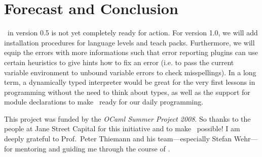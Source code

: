 
\section{Forecast and Conclusion}

\easyocaml\ in version 0.5 is not yet completely ready for action. For version 
1.0, we will add installation procedures for language levels and 
teach packs.
Furthermore, we will equip the errors with more informations such that error
reporting plugins can use certain heuristics to give hints how to fix an error
(i.e. to pass the current variable environment to unbound variable errors to
check misspellings).
In a long term, a dynamically typed interpreter would be great for the very
first lessons in programming without the need to think about types, as well as
the support for module declarations to make \easyocaml\ ready for our daily
programming.


This project was funded by the \emph{OCaml Summer Project 2008}.
So thanks to the people at Jane Street Capital for this initiative and to
make \easyocaml\ possible!
I am deeply grateful to Prof.\ Peter Thiemann and his team---especially Stefan
Wehr---for mentoring and guiding me through the course of \easyocaml.

